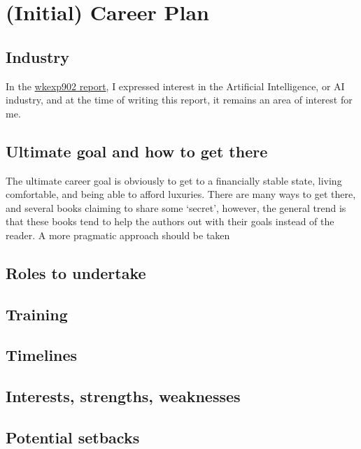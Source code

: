 \section{(Initial) Career Plan}

\subsection{Industry}
In the
\href{https://github.com/Arunscape/LaTeX-Stuff/blob/a732f319e8a6526f036bd424fa24f66941f09a5a/Work-Term-Reports/wkexp902/report.pdf}{wkexp902
report}, 
I expressed interest in the Artificial Intelligence, or AI industry, and at the
time of writing this report, it remains an area of interest for me. 


\subsection{Ultimate goal and how to get there}
The ultimate career goal is obviously to get to a financially stable state,
living comfortable, and being able to afford luxuries. There are many ways to
get there, and several books claiming to share some `secret', however, the 
general trend is that these books tend to help the authors out with their goals
instead of the reader. A more pragmatic approach should be taken

\subsection{Roles to undertake}

\subsection{Training}

\subsection{Timelines}

\subsection{Interests, strengths, weaknesses}

\subsection{Potential setbacks}
